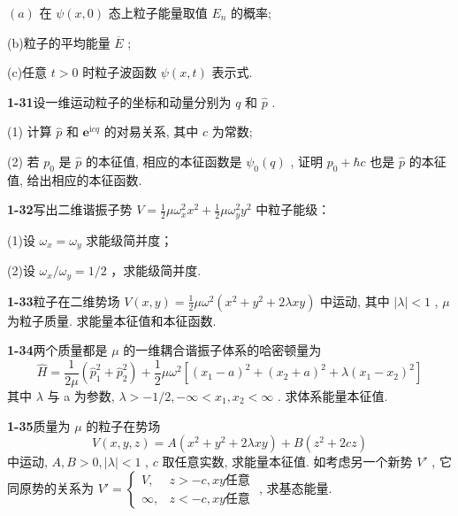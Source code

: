 $(a)$ 在 $\psi(x,0)$ 态上粒子能量取值 $E_{n}$ 的概率; 

(b)粒子的平均能量 $\overline{E}$ ; 

(c)任意 $t > 0$ 时粒子波函数 $\psi(x,t)$ 表示式.

\vfill

\newpage
\vfill

\noindent
\textbf{1-31}\quad 设一维运动粒子的坐标和动量分别为 $q$ 和 $\hat{p}$ . 

(1) 计算 $\hat{p}$ 和 $\mathbf{e}^{\mathrm{i}cq}$ 的对易关系, 其中 $c$ 为常数; 

(2) 若 $p_0$ 是 $\hat{p}$ 的本征值, 相应的本征函数是 $\psi_0(q)$ , 证明 $p_0 + \hbar c$ 也是 $\hat{p}$ 的本征值, 给出相应的本征函数.

\vfill

\newpage
\vfill

\noindent
\textbf{1-32}\quad 写出二维谐振子势 $V = \frac{1}{2}\mu \omega_x^2 x^2 +\frac{1}{2}\mu \omega_y^2 y^2$ 中粒子能级：

(1)设 $\omega_{x} = \omega_{y}$ 求能级简并度；

(2)设 $\omega_{x} / \omega_{y} = 1 / 2$ ，求能级简并度.

\vfill

\newpage
\vfill

\noindent
\textbf{1-33}\quad 粒子在二维势场 $V(x, y) = \frac{1}{2} \mu \omega^2 (x^2 + y^2 + 2\lambda xy)$ 中运动, 其中 $\left|\lambda\right| < 1$ , $\mu$ 为粒子质量. 求能量本征值和本征函数.

\vfill

\newpage
\vfill

\noindent
\textbf{1-34}\quad 两个质量都是 $\mu$ 的一维耦合谐振子体系的哈密顿量为
$$
\hat {H} = \frac {1}{2 \mu} (\hat {p} _ {1} ^ {2} + \hat {p} _ {2} ^ {2}) + \frac {1}{2} \mu \omega^ {2} [ (x _ {1} - a) ^ {2} + (x _ {2} + a) ^ {2} + \lambda (x _ {1} - x _ {2}) ^ {2} ]
$$
其中 $\lambda$ 与 a 为参数, $\lambda > -1/2, -\infty < x_{1}, x_{2} < \infty$ . 求体系能量本征值.

\vfill

\newpage
\vfill

\noindent
\textbf{1-35}\quad 质量为 $\mu$ 的粒子在势场
$$
V (x, y, z) = A \left(x ^ {2} + y ^ {2} + 2 \lambda x y\right) + B \left(z ^ {2} + 2 c z\right)
$$
中运动, $A, B > 0, |\lambda| < 1$ , $c$ 取任意实数, 求能量本征值. 如考虑另一个新势 $V'$ , 它同原势的关系为 $V' = \begin{cases} V, & z > -c, xy \text{任意} \\ \infty, & z < -c, xy \text{任意} \end{cases}$ , 求基态能量.

